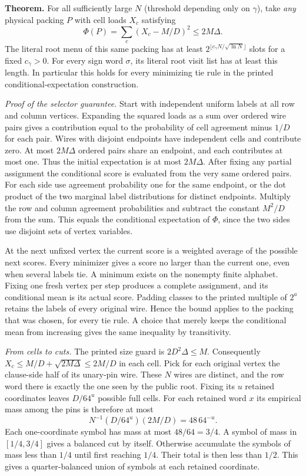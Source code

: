 \documentclass[
  11pt,
]{article}
\begin{document}
\textbf{Theorem.} For all sufficiently large \(N\) (threshold depending
only on \(\gamma\)), take \emph{any} physical packing \(P\) with cell
loads \(X_c\) satisfying
\[
  \Phi(P)=\sum_c(X_c-M/D)^2\le 2M\Delta .
\]
The literal root menu of this same packing has at least
\(2^{\lfloor c_\gamma N/\sqrt{\ln N}\rfloor}\) slots for a fixed
\(c_\gamma>0\). For every sign word \(\sigma\), its literal root visit
list has at least this length. In particular this holds for every
minimizing tie rule in the printed conditional-expectation construction.

\emph{Proof of the selector guarantee.} Start with independent uniform
labels at all row and column vertices. Expanding the squared loads as
a sum over ordered wire pairs gives a contribution equal to the
probability of cell agreement minus \(1/D\) for each pair. Wires with
disjoint endpoints have independent cells and contribute zero. At most
\(2M\Delta\) ordered pairs share an endpoint, and each contributes at
most one. Thus the initial expectation is at most \(2M\Delta\).
After fixing any partial assignment the conditional score is evaluated
from the very same ordered pairs. For each side use agreement
probability one for the same endpoint, or the dot product of the two
marginal label distributions for distinct endpoints. Multiply the row
and column agreement probabilities and subtract the constant \(M^2/D\)
from the sum. This equals the conditional expectation of \(\Phi\),
since the two sides use disjoint sets of vertex variables.

At the next unfixed vertex the current score is a weighted average of
the possible next scores. Every minimizer gives a score no larger than
the current one, even when several labels tie. A minimum exists on the
nonempty finite alphabet. Fixing one fresh vertex per step produces a
complete assignment, and its conditional mean is its actual score.
Padding classes to the printed multiple of \(2^a\) retains the labels
of every original wire. Hence the bound applies to the packing that
was chosen, for every tie rule. A choice that merely keeps the
conditional mean from increasing gives the same inequality by
transitivity.

\emph{From cells to cuts.} The printed size guard is \(2D^2\Delta\le M\).
Consequently \(X_c\le M/D+\sqrt{2M\Delta}\le2M/D\) in each cell. Pick
for each original vertex the clause-side half of its unary-pin wire.
These \(N\) wires are distinct, and the row word there is exactly the
one seen by the public root. Fixing its \(u\) retained coordinates leaves
\(D/64^u\) possible full cells. For each retained word \(x\) its
empirical mass among the pins is therefore at most
\[
  N^{-1}(D/64^u)(2M/D)=48\,64^{-u}.
\]
Each one-coordinate symbol has mass at most \(48/64=3/4\).
A symbol of mass in \([1/4,3/4]\) gives a balanced cut by itself.
Otherwise accumulate the symbols of mass less than \(1/4\) until first
reaching \(1/4\). Their total is then less than \(1/2\). This gives a
quarter-balanced union of symbols at each retained coordinate.
\end{document}

